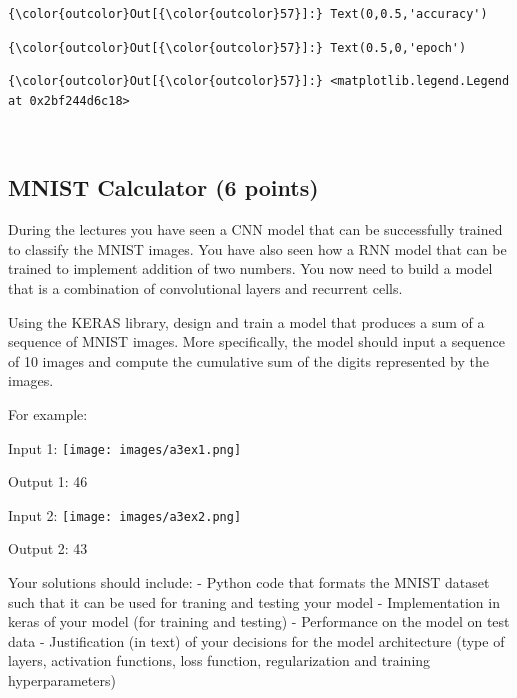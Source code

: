 \documentclass[11pt]{article}
\begin{document}
\begin{Verbatim}[commandchars=\\\{\}]
{\color{outcolor}Out[{\color{outcolor}57}]:} Text(0,0.5,'accuracy')
\end{Verbatim}
            
\begin{Verbatim}[commandchars=\\\{\}]
{\color{outcolor}Out[{\color{outcolor}57}]:} Text(0.5,0,'epoch')
\end{Verbatim}
            
\begin{Verbatim}[commandchars=\\\{\}]
{\color{outcolor}Out[{\color{outcolor}57}]:} <matplotlib.legend.Legend at 0x2bf244d6c18>
\end{Verbatim}
            
    \begin{center}
    \end{center}
    { \hspace*{\fill} \\}
    
    \hypertarget{mnist-calculator-6-points}{%
\subsection{MNIST Calculator (6
points)}\label{mnist-calculator-6-points}}

During the lectures you have seen a CNN model that can be successfully
trained to classify the MNIST images. You have also seen how a RNN model
that can be trained to implement addition of two numbers. You now need
to build a model that is a combination of convolutional layers and
recurrent cells.

Using the KERAS library, design and train a model that produces a sum of
a sequence of MNIST images. More specifically, the model should input a
sequence of 10 images and compute the cumulative sum of the digits
represented by the images.

For example:

Input 1: \texttt{[image: images/a3ex1.png]}

Output 1: 46

Input 2: \texttt{[image: images/a3ex2.png]}

Output 2: 43

Your solutions should include: - Python code that formats the MNIST
dataset such that it can be used for traning and testing your model -
Implementation in keras of your model (for training and testing) -
Performance on the model on test data - Justification (in text) of your
decisions for the model architecture (type of layers, activation
functions, loss function, regularization and training hyperparameters)
\end{document}
